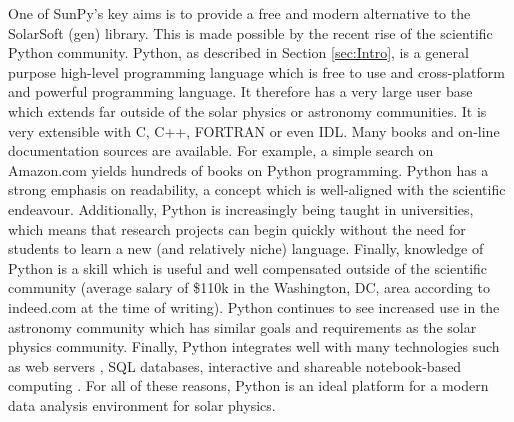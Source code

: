 One of SunPy's key aims is to provide a free and modern alternative to the 
SolarSoft (gen) library. This is made possible by the recent rise of the 
scientific Python community. Python, as described in Section \ref{sec:Intro}, 
is a general purpose high-level programming language which is free to use and 
cross-platform and powerful programming language.
It therefore has a very large user base which extends far outside of the 
solar physics or astronomy communities. It is very extensible with C, C++, 
FORTRAN or even IDL. Many books and on-line documentation sources are available. For 
example, a simple search on Amazon.com yields hundreds of books on Python programming.
%
% 
Python has a strong emphasis on readability, a concept which is well-aligned with the scientific endeavour.
Additionally, Python is increasingly being taught in universities, which means 
that research projects can begin quickly without the need for students to learn 
a new (and relatively niche) language. Finally, knowledge of Python is a skill 
which is useful and well compensated outside of the scientific community 
(average salary of \$110k in the Washington, DC, area according to indeed.com at 
the time of writing). Python continues to see increased use in the astronomy 
community \citep{greenfield2011} which has similar goals and requirements as 
the solar physics community. Finally, Python integrates well with many 
technologies such as web servers \citep{dolgert2008}, SQL databases, 
interactive and shareable notebook-based computing \citep{perez2007}. For all 
of these reasons, Python is an ideal platform for a modern data analysis environment 
for solar physics.

